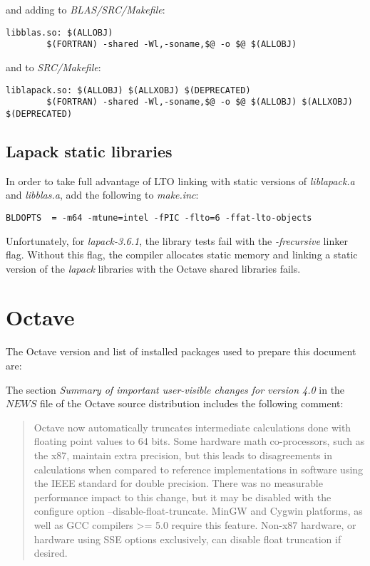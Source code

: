 \documentclass[a4paper,twoside,10pt,english]{report}
\begin{document}
and adding to \emph{BLAS/SRC/Makefile}:
\begin{small}
\begin{verbatim}
libblas.so: $(ALLOBJ)
        $(FORTRAN) -shared -Wl,-soname,$@ -o $@ $(ALLOBJ)
\end{verbatim}
\end{small}
and to \emph{SRC/Makefile}:
\begin{small}
\begin{verbatim}
liblapack.so: $(ALLOBJ) $(ALLXOBJ) $(DEPRECATED)
        $(FORTRAN) -shared -Wl,-soname,$@ -o $@ $(ALLOBJ) $(ALLXOBJ) $(DEPRECATED)
\end{verbatim}
\end{small}
\subsection*{Lapack static libraries}
In order to take full advantage of LTO linking with static versions of 
\emph{liblapack.a} and \emph{libblas.a}, add the following to \emph{make.inc}:
\begin{small}
\begin{verbatim}
BLDOPTS  = -m64 -mtune=intel -fPIC -flto=6 -ffat-lto-objects
\end{verbatim}
\end{small}
Unfortunately, for \emph{lapack-3.6.1}, the library tests fail with the 
\emph{-frecursive} linker flag. Without this flag, the compiler allocates 
static memory and linking a static version of the \emph{lapack} libraries
with the Octave shared libraries fails.

\section*{Octave}
The Octave version and list of installed packages used to prepare this document
are:
\begin{small}

\end{small}

The section \emph{Summary of important user-visible changes for version 4.0} in 
the $NEWS$ file of the Octave source distribution includes the following comment:
\begin{quote}
  Octave now automatically truncates intermediate calculations done with
  floating point values to 64 bits.  Some hardware math co-processors, such
  as the x87, maintain extra precision, but this leads to disagreements in
  calculations when compared to reference implementations in software using
  the IEEE standard for double precision.  There was no measurable
  performance impact to this change, but it may be disabled with the
  configure option --disable-float-truncate.  MinGW and Cygwin platforms,
  as well as GCC compilers >= 5.0 require this feature.  Non-x87 hardware,
  or hardware using SSE options exclusively, can disable float truncation
  if desired.
\end{quote}
\end{document}
